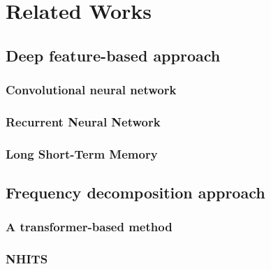 
\chapter{Related Works}
\label{chap:related_work}


\section{Deep feature-based approach}

\subsection{Convolutional neural network}

\subsection{Recurrent Neural Network}

\subsection{Long Short-Term Memory}

\section{Frequency decomposition approach}

\subsection{A transformer-based method}

\subsection{NHITS}



